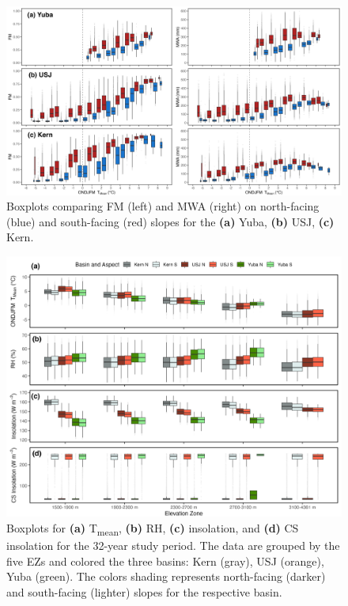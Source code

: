 \begin{figure}[t]
\centering
\includegraphics[width=\textwidth]{figures/ch2_figs/aspect_temp_mwa_fum_full_boxplots_v2.png}
\caption{Boxplots comparing FM (left) and MWA (right) on north-facing (blue) and south-facing (red) slopes for the \textbf{(a)} Yuba, \textbf{(b)} USJ, \textbf{(c)} Kern.}
\label{fig:aspec_mwa_fm_bp}
\end{figure}

\begin{figure}[h]
\centering
\includegraphics[width=\textwidth]{figures/ch2_figs/met4_boxplot_v5.png}
\caption{Boxplots for \textbf{(a)} T\textsubscript{mean}, \textbf{(b)} RH, \textbf{(c)} insolation, and \textbf{(d)} CS insolation for the 32-year study period. The data are grouped by the five EZs and colored the three basins: Kern (gray), USJ (orange), Yuba (green). The colors shading represents north-facing (darker) and south-facing (lighter) slopes for the respective basin.}
\label{fig:met_boxplots}
\end{figure}

